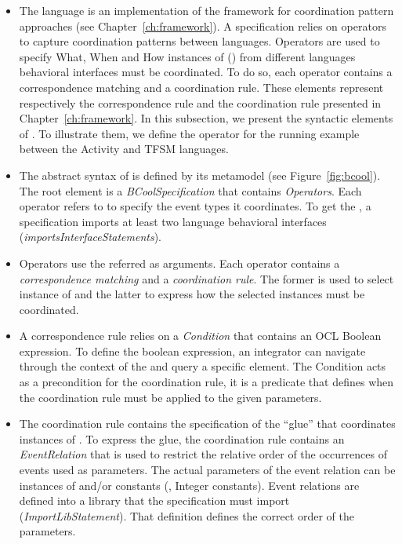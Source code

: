 \begin{itemize}
	\item The \bcool language is an implementation of the framework for coordination pattern approaches (see Chapter~\ref{ch:framework}). A \bcool specification relies on operators to capture coordination patterns between languages. Operators are used to specify What, When and How instances of \dse (\mse) from different languages behavioral interfaces must be coordinated. To do so, each operator contains a correspondence matching and a coordination rule. These elements represent respectively the correspondence rule and the coordination rule presented in Chapter~\ref{ch:framework}. In this subsection, we present the syntactic elements of \bcool. To illustrate them, we define the operator for the running example between the Activity and TFSM languages.
	
	\item The abstract syntax of \bcool is defined by its metamodel (see Figure~\ref{fig:bcool}). The root element is a \emph{BCoolSpecification} that contains \emph{Operators}. Each operator refers to \dse to specify the event types it coordinates. To get the \dse, a \bcool specification imports at least two language behavioral interfaces (\emph{importsInterfaceStatements}). 
	
	\item Operators use the referred \dse as arguments. Each operator contains a \emph{correspondence matching} and a \emph{coordination rule}. The former is used to select instance of \dse and the latter to express how the selected instances must be coordinated. 
	
	\item A correspondence rule relies on a \emph{Condition} that contains an OCL Boolean expression. To define the boolean expression, an integrator can navigate through the context of the \dse and query a specific element. The Condition acts as a precondition for the coordination rule, \ie it is a predicate that defines when the coordination rule must be applied to the given parameters.
	
	\item The coordination rule contains the specification of the ``glue'' that coordinates instances of \dse. To express the glue, the coordination rule contains an \emph{EventRelation} that is used to restrict the relative order of the occurrences of events used as parameters. The actual parameters of the event relation can be instances of \dse and/or constants (\eg, Integer constants). Event relations are defined into a \moccml library that the \bcool specification must import (\emph{ImportLibStatement}). That definition defines the correct order of the parameters. 


\end{itemize}
